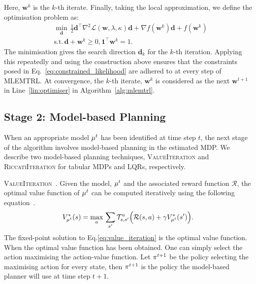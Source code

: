 Here, $\bm{w}^k$ is the $k$-th iterate. Finally, taking the local approximation, we define the optimisation problem as:
\begin{equation}
    \begin{aligned}
        &\underset{\bm{d}}{\min} \, \frac{1}{2}\bm{d}^\top \nabla^2 \mathcal{L}(\bm{w},\lambda,\kappa)\bm{d}+\nabla f(\bm{w}^k)\bm{d}+f(\bm{w}^k)\\
        &\textrm{s.t.} \, \bm{d} + \bm{w}^k \geq 0, \mathbf{1}^\top\bm{w}^k = 1.
    \end{aligned}
\end{equation}
The minimisation gives the search direction $\bm{d}_k$ for the $k$-th iteration. Applying this repeatedly and using the construction above ensures that the constraints posed in Eq.~\ref{eq:constrained_likelihood} are adhered to at every step of MLEMTRL. At convergence, the $k$-th iterate, $\bm{w}^k$ is considered as the next $\bm{w}^{t+1}$ in Line~\ref{lin:optimiser} in Algorithm~\ref{alg:mlemtrl}.

\subsection{Stage 2: Model-based Planning}
When an appropriate model $\mu^t$ has been identified at time step $t$, the next stage of the algorithm involves model-based planning in the estimated MDP. We describe two model-based planning techniques, \textsc{ValueIteration} and \textsc{RiccatiIteration} for tabular MDPs and LQRs, respectively.

\noindent\textsc{ValueIteration~.}
Given the model, $\mu^t$ and the associated reward function $\mathcal{R}$, the optimal value function of $\mu^t$ can be computed iteratively using the following equation~\citep{Sutton2018}.
\begin{equation}\label{eq:value_iteration}
    V_{\mu^t}^{*}(s) = \underset{a}{\max} \, \sum_{s'}\mathcal{T}_{s,s'}^a\Big(\mathcal{R}(s,a)+\gamma V_{\mu^t}^{*}(s')\Big).
\end{equation}
The fixed-point solution to Eq.\ref{eq:value_iteration} is the optimal value function. When the optimal value function has been obtained. One can simply select the action maximising the action-value function. Let $\pi^{t+1}$ be the policy selecting the maximising action for every state, then $\pi^{t+1}$ is the policy the model-based planner will use at time step $t+1$.

